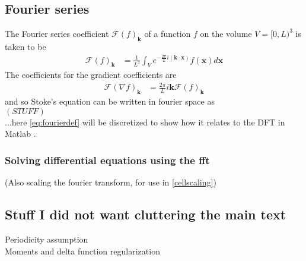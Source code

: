 \documentclass[a4paper,twoside=false,abstract=false,numbers=noenddot,
titlepage=false,headings=small,parskip=half,version=last]{scrartcl}
\begin{document}
\subsection{Fourier series}
The Fourier series coefficient $\mathcal{F}(f)_{\mathbf{k}}$ of a function $f$ on the volume $V=[0,L)^3$ is taken to be
\begin{align}
\mathcal{F}(f)_{\mathbf{k}} &= \frac{1}{L^3} \int_V e^{-\frac{2\pi}{L}i(\mathbf{k}\cdot \mathbf{x})}f(\mathbf{x})d\mathbf{x}
    \label{eq:fourierdef}
\end{align}
The coefficients for the gradient coefficients are
\begin{align}
\mathcal{F}(\nabla f)_{\mathbf{k}} &= \frac{2\pi}{L}i\mathbf{k} \mathcal{F}(f)_{\mathbf{k}}
\end{align}
and so Stoke's equation can be written in fourier space as \\
$\left(STUFF\right)$\\
...here \eqref{eq:fourierdef} will be discretized to show how it relates to the DFT in Matlab \cite{matlab}.

\subsubsection{Solving differential equations using the fft}
(Also scaling the fourier transform, for use in \ref{cellscaling})
\subsection{Stuff I did not want cluttering the main text}
Periodicity assumption\\
Moments and delta function regularization
\end{document}
